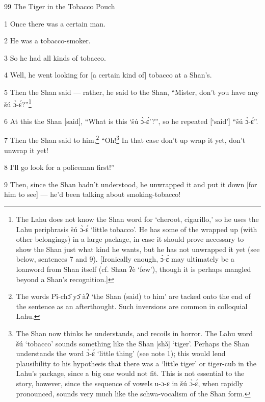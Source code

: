
99 The Tiger in the Tobacco Pouch

1 Once there was a certain man.

2 He was a tobacco-smoker.

3 So he had all kinds of tobacco.

4 Well, he went looking for [a certain kind of] tobacco at a Shan's.

5 Then the Shan said --- rather, he said to the Shan, ``Mister, don't you have
any šú ɔ̀-ɛ́?''\footnote{The Lahu does not know the Shan word for `cheroot, cigarillo,' so he uses the Lahu periphrasis šú ɔ̀-ɛ́ `little tobacco'. He has some of the wrapped up (with other belongings) in a large package, in case it should prove necessary to show the Shan just what kind he wants, but he has not unwrapped it yet (see below, sentences 7 and 9). [Ironically enough, ɔ̀-ɛ́ may ultimately be a loanword from Shan itself (cf. Shan ʔè `few'), though it is perhaps mangled beyond a Shan's recognition.]}

6 At this the Shan [said], ``What is this `šú ɔ̀-ɛ́'?'', so he repeated [`said']
``šú ɔ̀-ɛ́''.

7 Then the Shan said to him,\footnote{The words Pî-chɔ̂ yɔ̂ àʔ `the Shan (said) to him' are tacked onto the end of the sentence as an afterthought. Such inversions are common in colloquial Lahu.} ``Oh!\footnote{The Shan now thinks he understands, and recoils in horror. The Lahu word šú `tobacco' sounds something like the Shan [shə̌] `tiger'. Perhaps the Shan understands the word ɔ̀-ɛ́ `little thing' (see note 1); this would lend plausibility to his hypothesis that there was a `little tiger' or tiger-cub in the Lahu's package, since a big one would not fit. This is not essential to the story, however, since the sequence of vowels u-ɔ-ɛ in šú ɔ̀-ɛ́, when rapidly pronounced, sounds very much like the schwa-vocalism of the Shan form.} In that case don't up wrap it yet, don't
unwrap it yet!

8 I'll go look for a policeman first!''

9 Then, since the Shan hadn't understood, he unwrapped it and put it down [for
him to see] --- he'd been talking about smoking-tobacco!

